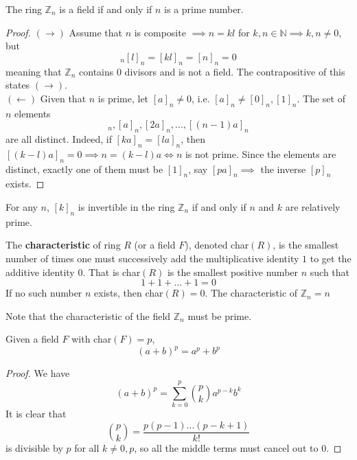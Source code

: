   \begin{theorem}
    The ring $\mathbb{Z}_{n}$ is a field if and only if $n$ is a prime number. 
  \end{theorem}
  \begin{proof}
    $(\rightarrow)$ Assume that $n$ is composite $\implies n = k l$ for $k, n \in \mathbb{N} \implies k, n \neq 0$, but 
    \begin{equation}
      [k]_n [l]_n = [k l]_n = [n]_n = 0
    \end{equation}
    meaning that $\mathbb{Z}_n$ contains $0$ divisors and is not a field. The contrapositive of this states $(\rightarrow)$. \\
    $(\leftarrow)$ Given that $n$ is prime, let $[a]_n \neq 0$, i.e. $[a]_n \neq [0]_n, [1]_n$. The set of $n$ elements 
    \begin{equation}
      [0]_n, [a]_n, [2a]_n, ..., [(n-1)a]_n
    \end{equation}
    are all distinct. Indeed, if $[k a]_n = [l a]_n$, then $[(k-l) a]_n = 0 \implies n = (k-l) a \iff n$ is not prime. Since the elements are distinct, exactly one of them must be $[1]_n$, say $[p a]_n \implies$ the inverse $[p]_n$ exists. 
  \end{proof}

  \begin{corollary}
    For any $n$, $[k]_n$ is invertible in the ring $\mathbb{Z}_n$ if and only if $n$ and $k$ are relatively prime. 
  \end{corollary}

  \begin{definition}
    The \textbf{characteristic} of ring $R$ (or a field $F$), denoted char$(R)$, is the smallest number of times one must successively add the multiplicative identity $1$ to get the additive identity $0$. That is char$(R)$ is the smallest positive number $n$ such that 
    \begin{equation}
      1 + 1 + ... + 1 = 0 
    \end{equation}
    If no such number $n$ exists, then char$(R) = 0$. The characteristic of $\mathbb{Z}_n = n$
  \end{definition}

  Note that the characteristic of the field $\mathbb{Z}_n$ must be prime. 

  \begin{theorem}
    Given a field $F$ with char$(F) = p$, 
    \begin{equation}
      (a + b)^p = a^p + b^p
    \end{equation}
  \end{theorem}
  \begin{proof}
    We have 
    \begin{equation}
      (a + b)^p = \sum_{k = 0}^p \binom{p}{k} a^{p-k} b^{k}
    \end{equation}
    It is clear that 
    \begin{equation}
      \binom{p}{k} = \frac{p (p-1) ... (p - k+1)}{k!}
    \end{equation}
    is divisible by $p$ for all $k \neq 0, p$, so all the middle terms must cancel out to $0$. 
  \end{proof}

